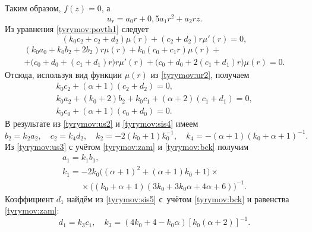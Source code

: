 Таким образом, $ f(z)=0$, а
\begin{equation}\label{tyrymov:ur_3}
    u_r=a_0r+0,5a_1r^2+a_2rz.
\end{equation}
Из уравнения \eqref{tyrymov:povth1} следует
$$(k_0c_2+c_2+d_2)\mu(r)+(c_2+d_2)r\mu'(r)=0,$$
\begin{multline*}
      (k_0a_0+k_0b_2+2b_2)r\mu(r)+k_0(c_0+c_1r)\mu(r)+ \\ 
      +\bigl(c_0+d_0+(c_1+d_1)r\bigr)r\mu'(r)       + \bigl(c_0+d_0+2(c_1+d_1)r\bigr)\mu(r)=0.
\end{multline*}
 Отсюда, используя вид функции $\mu(r)$  из
\eqref{tyrymov:ur2}, получаем
\begin{gather}
\label{tyrymov:sis4}
          k_0c_2+(\alpha+1)(c_2+d_2)=0,
\\
\label{tyrymov:sis5}
      k_0a_2+(k_0+2)b_2+k_0c_1+(\alpha+2)(c_1+d_1)=0,
\\
\label{tyrymov:sis6}
          k_0c_0+(\alpha+1)(c_0+d_0)=0.
    \end{gather}
В результате из \eqref{tyrymov:us2} и \eqref{tyrymov:sis4} имеем
\begin{equation}\label{tyrymov:bck}
    b_2=k_2a_2,\quad c_2=k_4d_2, \quad  k_2=-2(k_0+1)k_0^{-1}, \quad
    k_4=-(\alpha+1)(k_0+\alpha+1)^{-1}.
\end{equation}
Из \eqref{tyrymov:us3} с учётом \eqref{tyrymov:zam} и \eqref{tyrymov:bck} получим
\begin{equation}\label{tyrymov:a1} 
\begin{array}{l}
  a_1=k_1b_1, \\
  k_1=-2k_0\bigl((\alpha+1)^2+(\alpha+1)k_0+1\bigr)\times \\ 
\qquad ~  \times
  \bigl((k_0+\alpha+1)(3k_0+3k_0\alpha+4\alpha+6)\bigr)^{-1}. 
\end{array}
  \end{equation}
Коэффициент $d_1$  найдём из \eqref{tyrymov:sis5} с~учётом \eqref{tyrymov:bck} и равенства \eqref{tyrymov:zam}:
\begin{equation}\label{tyrymov:d1}
    d_1=k_3c_1,\quad
    k_3=(4k_0+4-k_0\alpha)\left[k_0(\alpha+2)\right]^{-1}.
\end{equation}
